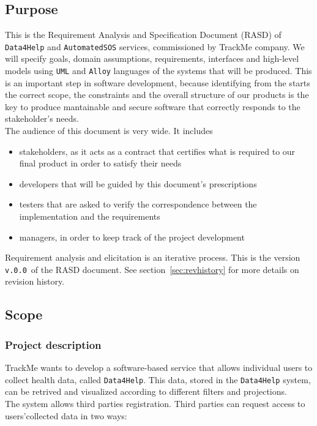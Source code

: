 \documentclass[12pt]{article}
\def \thisDocVersion {\texttt{v.0.0}}
\begin{document}
  \subsection{Purpose}

    This is the Requirement Analysis and Specification Document (RASD) of \texttt{Data4Help} and \texttt{AutomatedSOS} services, commissioned by TrackMe company. We will specify goals, domain assumptions, requirements, interfaces and high-level models using \texttt{UML} and \texttt{Alloy} languages of the systems that will be produced. This is an important step in software development, because identifying from the starts the correct scope, the constraints and the overall structure of our products is the key to produce mantainable and secure software that correctly responds to the stakeholder's needs. \\
    The audience of this document is very wide. It includes
    \begin{itemize}
      \item stakeholders, as it acts as a contract that certifies what is required to our final product in order to satisfy their needs
      \item developers that will be guided by this document's prescriptions
      \item testers that are asked to verify the correspondence between the implementation and the requirements
      \item managers, in order to keep track of the project development
    \end{itemize}

    Requirement analysis and elicitation is an iterative process. This is the version \thisDocVersion\ of the RASD document. See section~\ref{sec:revhistory} for more details on revision history.

  \subsection{Scope}

      \subsubsection{Project description}

        TrackMe wants to develop a software-based service that allows individual users to collect health data, called \texttt{Data4Help}. This data, stored in the \texttt{Data4Help} system, can be retrived and visualized according to different filters and projections. \\
        The system allows third parties registration. Third parties can request access to users'collected data in two ways:
\end{document}
